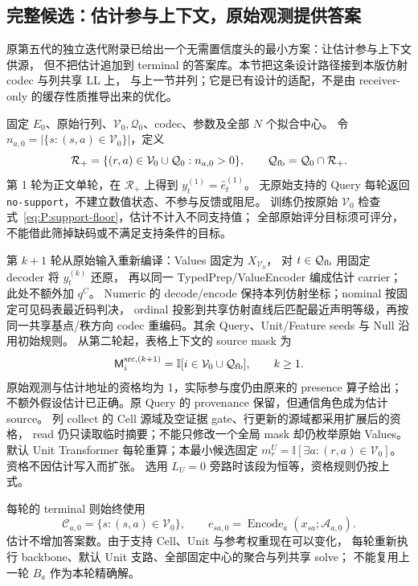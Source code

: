 \documentclass[11pt,UTF8,fontset=fandol]{ctexart}
\numberwithin{equation}{section}
\theoremstyle{definition}
\newcommand{\Vset}{\mathcal V}
\newcommand{\Qset}{\mathcal Q}
\newcommand{\ind}{\mathbb I}
\begin{document}
\subsection{完整候选：估计参与上下文，原始观测提供答案}
\label{v53g:subsec:context-feedback}
原第五代的独立迭代附录已给出一个无需置信度头的最小方案：让估计参与上下文供源，
但不把估计追加到 terminal 的答案库。本节把这条设计路径接到本版仿射 codec 与列共享 LL 上，
与上一节并列；它是已有设计的适配，不是由 receiver-only 的缓存性质推导出来的优化。

固定 $E_0$、原始行列、$\Vset_0,\Qset_0$、codec、参数及全部 $N$ 个拟合中心。
令 $n_{a,0}=|\{s:(s,a)\in\Vset_0\}|$，定义
\begin{equation}
 \mathcal R_+=\{(r,a)\in\Vset_0\cup\Qset_0:n_{a,0}>0\},\qquad
 \mathcal Q_{\rm fb}=\Qset_0\cap\mathcal R_+.
 \label{v53g:eq:feedback-domain}
\end{equation}
第 1 轮为正文单轮，在 $\mathcal R_+$ 上得到 $y_t^{(1)}=\widehat e_t^{(1)}$。
无原始支持的 Query 每轮返回 \texttt{no-support}，不建立数值状态、不参与反馈或阻尼。
训练仍按原始 $\Vset_0$ 检查式~\eqref{eq:P:support-floor}，估计不计入不同支持值；
全部原始评分目标须可评分，不能借此筛掉缺码或不满足支持条件的目标。

第 $k+1$ 轮从原始输入重新编译：Values 固定为 $X_{\Vset_0}$，
对 $t\in\mathcal Q_{\rm fb}$ 用固定 decoder 将 $y_t^{(k)}$ 还原，
再以同一 TypedPrep/ValueEncoder 编成估计 carrier；此处不额外加 $q^C$。
Numeric 的 decode/encode 保持本列仿射坐标；nominal 按固定可见码表最近码判决，
ordinal 投影到共享仿射直线后匹配最近声明等级，再按同一共享基点/秩方向 codec 重编码。其余 Query、Unit/Feature seeds 与 Null 沿用初始规则。
从第二轮起，表格上下文的 source mask 为
\begin{equation}
 \mathsf M_i^{{\rm src},(k+1)}
 =\ind[i\in\Vset_0\cup\mathcal Q_{\rm fb}],\qquad k\ge1.
 \label{v53g:eq:context-source-mask}
\end{equation}
原始观测与估计地址的资格均为 1，实际参与度仍由原来的 presence 算子给出；
不额外假设估计已正确。原 Query 的 provenance 保留，但通信角色成为估计 source。
列 collect 的 Cell 源域及空证据 gate、行更新的源域都采用扩展后的资格，
read 仍只读取临时摘要；不能只修改一个全局 mask 却仍枚举原始 Values。
默认 Unit Transformer 每轮重算；本最小候选固定
$m_r^U=\ind[\exists a:(r,a)\in\Vset_0]$。资格不因估计写入而扩张。
选用 $L_U=0$ 旁路时该段为恒等，资格规则仍按上式。

每轮的 terminal 则始终使用
\begin{equation}
 \mathcal C_{a,0}=\{s:(s,a)\in\Vset_0\},\qquad
 e_{sa,0}=\operatorname{Encode}_a(x_{sa};\mathcal A_{a,0}).
 \label{v53g:eq:original-answer-bank}
\end{equation}
估计不增加答案数。由于支持 Cell、Unit 与参考权重现在可以变化，
每轮重新执行 backbone、默认 Unit 支路、全部固定中心的聚合与列共享 solve；
不能复用上一轮 $B_a$ 作为本轮精确解。
\end{document}

